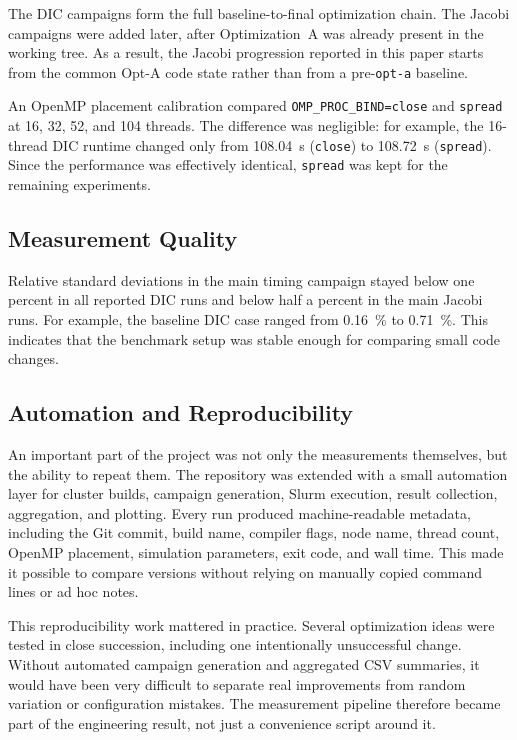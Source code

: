\documentclass[10pt,firstlineindent,nopartpage,article,accentcolor=tud1b]{tudreport}
\begin{document}
The DIC campaigns form the full baseline-to-final optimization chain. The
Jacobi campaigns were added later, after Optimization~A was already present in
the working tree. As a result, the Jacobi progression reported in this paper
starts from the common Opt-A code state rather than from a pre-\texttt{opt-a}
baseline.

An OpenMP placement calibration compared \texttt{OMP\_PROC\_BIND=close} and
\texttt{spread} at 16, 32, 52, and 104 threads. The difference was negligible:
for example, the 16-thread DIC runtime changed only from \SI{108.04}{s}
(\texttt{close}) to \SI{108.72}{s} (\texttt{spread}). Since the performance was
effectively identical, \texttt{spread} was kept for the remaining experiments.

\subsection{Measurement Quality}
Relative standard deviations in the main timing campaign stayed below one
percent in all reported DIC runs and below half a percent in the main Jacobi
runs. For example, the baseline DIC case ranged from
\SI{0.16}{\percent} to \SI{0.71}{\percent}. This indicates that the benchmark
setup was stable enough for comparing small code changes.

\subsection{Automation and Reproducibility}
An important part of the project was not only the measurements themselves, but
the ability to repeat them. The repository was extended with a small automation
layer for cluster builds, campaign generation, Slurm execution, result
collection, aggregation, and plotting. Every run produced machine-readable
metadata, including the Git commit, build name, compiler flags, node name,
thread count, OpenMP placement, simulation parameters, exit code, and wall
time. This made it possible to compare versions without relying on manually
copied command lines or ad hoc notes.

This reproducibility work mattered in practice. Several optimization ideas were
tested in close succession, including one intentionally unsuccessful change.
Without automated campaign generation and aggregated CSV summaries, it would
have been very difficult to separate real improvements from random variation or
configuration mistakes. The measurement pipeline therefore became part of the
engineering result, not just a convenience script around it.
\end{document}
